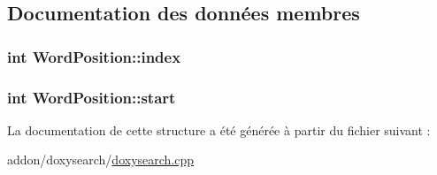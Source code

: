 \subsection{Documentation des données membres}
\hypertarget{struct_word_position_afe4308fd431b2908e19e0ce3bf38ca03}{}
\subsubsection[{index}]{\setlength{\rightskip}{0pt plus 5cm}int Word\+Position\+::index}\label{struct_word_position_afe4308fd431b2908e19e0ce3bf38ca03}
\hypertarget{struct_word_position_a497a50911b827ff10e9c7ab7ec23640d}{}
\subsubsection[{start}]{\setlength{\rightskip}{0pt plus 5cm}int Word\+Position\+::start}\label{struct_word_position_a497a50911b827ff10e9c7ab7ec23640d}


La documentation de cette structure a été générée à partir du fichier suivant \+:\begin{DoxyCompactItemize}
\item 
addon/doxysearch/\hyperlink{doxysearch_8cpp}{doxysearch.\+cpp}\end{DoxyCompactItemize}
